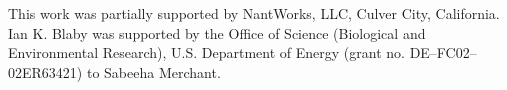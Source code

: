 \documentclass[aps,pra,reprint,superscriptaddress]{revtex4-1}
\begin{document}


%



\begin{acknowledgments}
This work was partially supported by NantWorks, LLC, Culver City, California. Ian K. Blaby was supported by the Office of Science (Biological and Environmental Research), U.S. Department of Energy (grant no. DE–FC02–02ER63421) to Sabeeha Merchant.
\end{acknowledgments}


\end{document}
